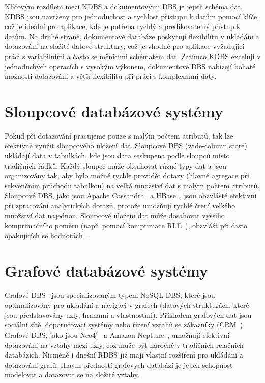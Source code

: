 \documentclass[czech,master,dept460,male,csharp,cpdeclaration]{diploma}
\begin{document}
	Klíčovým rozdílem mezi KDBS a dokumentovými DBS je jejich schéma dat. KDBS jsou navrženy pro jednoduchost a rychlost přístupu k datům pomocí klíče, což je ideální pro aplikace, kde je potřeba rychlý a predikovatelný přístup k datům. Na druhé straně, dokumentové databáze poskytují flexibilitu v ukládání a dotazování na složité datové struktury, což je vhodné pro aplikace vyžadující práci s variabilními a často se měnícími schématem dat. Zatímco KDBS excelují v jednoduchých operacích s vysokým výkonem, dokumentové DBS nabízejí bohaté možnosti dotazování a větší flexibilitu při práci s komplexními daty.
	
	\section{Sloupcové databázové systémy}
	
	Pokud při dotazování pracujeme pouze s malým počtem atributů, tak lze efektivně využít sloupcového uložení dat. Sloupcové DBS (wide-column store)~\cite{nosql} ukládají data v tabulkách, kde jsou data seskupena podle sloupců místo tradičních řádků. Každý sloupec může obsahovat různé typy dat a jsou organizovány tak, aby bylo možné rychle provádět dotazy (hlavně agregace při sekvenčním průchodu tabulkou) na velká množství dat s malým počtem atributů. Sloupcové DBS, jako jsou Apache Cassandra~\cite{cassandra} a HBase~\cite{hbase}, jsou obzvláště efektivní při zpracování analytických dotazů, protože umožňují rychlé čtení velkého množství dat najednou. Sloupcové uložení dat může dosahovat vyššího komprimačního poměru (např. pomocí komprimace RLE~\cite{rle}), obzvlášť při často opakujících se hodnotách~\cite{base-vsb}.
	
	\section{Grafové databázové systémy}
	
	Grafové DBS~\cite{nosql} jsou specializovaným typem NoSQL DBS, které jsou optimalizovány pro ukládání a navigaci v grafech (datových strukturách, které jsou představovány uzly, hranami a vlastnostmi). Příkladem grafových dat jsou sociální sítě, doporučovací systémy nebo řízení vztahů se zákazníky (CRM~\cite{crm}). Grafové DBS, jako jsou Neo4j~\cite{neo4j} a Amazon Neptune~\cite{amazon-neptune}, umožňují efektivní dotazování na vztahy mezi uzly, což může být náročné v tradičních relačních databázích. Nicméně i dnešní RDBS již mají vlastní rozšíření pro ukládání a dotazování grafů. Hlavní předností grafových databází je jejich schopnost modelovat a dotazovat se na složité vztahy.
	
\end{document}
